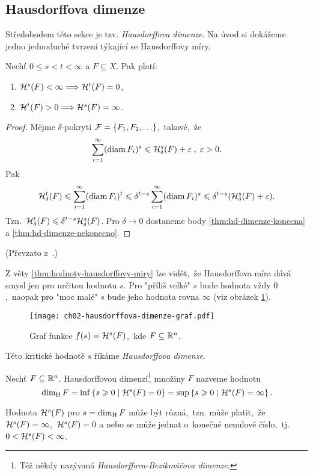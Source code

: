 \subsection{Hausdorffova dimenze}\label{subsec:hausdorffova-dimenze}

Středobodem této sekce je tzv. \emph{Hausdorffova dimenze}. Na úvod si dokážeme jedno jednoduché tvrzení týkající se Hausdorffovy míry.
\begin{theorem}\label{thm:hodnoty-hausdorffovy-miry}
    Nechť $0\leqslant s<t<\infty$ a $F\subseteq X$. Pak platí:
    \begin{enumerate}[label=(\roman*)]
        \item\label{thm:hd-dimenze-konecna} $\mathcal{H}^{s}(F)<\infty\Longrightarrow\mathcal{H}^{t}(F)=0$,
        \item\label{thm:hd-dimenze-nekonecno} $\mathcal{H}^{t}(F)>0\Longrightarrow\mathcal{H}^{s}(F)=\infty$.
    \end{enumerate}
\end{theorem}
\begin{proof}
    Mějme $\delta$-pokrytí $\mathcal{F}=\left\{F_1,F_2,\ldots\right\}$,~takové,~že
    \[\sum_{i=1}^{\infty}(\operatorname{diam}{F_i})^s\leqslant\mathcal{H}_{\delta}^{s}(F)+\varepsilon\;,\;\varepsilon>0.\]
    Pak
    \[\mathcal{H}_{\delta}^{t}(F)\leqslant\sum_{i=1}^{\infty}(\operatorname{diam}{F_i})^t\leqslant\delta^{t-s}\sum_{i=1}^{\infty}(\operatorname{diam}{F_i})^s\leqslant\delta^{t-s}(\mathcal{H}_{\delta}^{s}(F)+\varepsilon).\]
    Tzn.~$\mathcal{H}_{\delta}^{t}(F)\leqslant\delta^{t-s}\mathcal{H}_{\delta}^{s}(F)$. Pro $\delta\to 0$ dostaneme body \ref{thm:hd-dimenze-konecna} a \ref{thm:hd-dimenze-nekonecno}.
\end{proof}
(Převzato z~\citep[str. 68]{Mattila1995}.)

Z věty \ref{thm:hodnoty-hausdorffovy-miry} lze vidět,~že Hausdorffova míra dává smysl jen pro určitou hodnotu $s$. Pro "příliš velké" $s$ bude hodnota vždy $0$,~naopak pro "moc malé" $s$ bude jeho hodnota rovna $\infty$ (viz obrázek \ref{fig:hausdorffova-dimenze-graf}).
\begin{figure}[h]
    \centering
    \texttt{[image: ch02-hausdorffova-dimenze-graf.pdf]}
    \caption{Graf funkce $f(s)=\mathcal{H}^{s}(F)$,~kde $F\subseteq\mathbb{R}^n$.}
    \label{fig:hausdorffova-dimenze-graf}
\end{figure}
Této kritické hodnotě $s$ říkáme \emph{Hausdorffova dimenze}.
\begin{definition}\label{def:hausdorffova-dimenze}
    Nechť $F\subseteq\mathbb{R}^n$. Hausdorffovou dimenzí\footnote{Též někdy nazývaná \emph{Hausdorffova-Bezikovičova dimenze}. } množiny $F$ nazveme hodnotu
    \[\operatorname{dim_H}{F}=\inf\left\{s\geqslant 0\mid\mathcal{H}^{s}(F)=0\right\}=\sup\left\{s\geqslant 0\mid\mathcal{H}^{s}(F)=\infty\right\}.\]
\end{definition}
Hodnota $\mathcal{H}^{s}(F)$ pro $s=\operatorname{dim_H}{F}$ může být různá,~tzn. může platit,~že $\mathcal{H}^{s}(F)=\infty$,~$\mathcal{H}^{s}(F)=0$ a nebo se může jednat o~konečné nenulové číslo,~tj. $0<\mathcal{H}^{s}(F)<\infty$.

